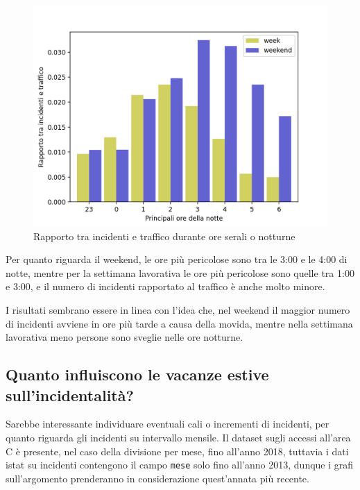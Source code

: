 \documentclass[a4paper]{report}
\newcommand{\columnstyle}[1]{\texttt{#1}}
\begin{document}
\begin{figure}
    \includegraphics[width=\linewidth]{../src/area_c/rapporto_inc_notte.png}
    \caption{Rapporto tra incidenti e traffico durante ore serali o notturne}
    \label{fig:rapp-inc-traff}
\end{figure}

Per quanto riguarda il weekend, le ore più pericolose sono tra le 3:00 e le 4:00 di notte, mentre per 
la settimana lavorativa le ore più pericolose sono quelle tra 1:00 e 3:00, e il numero di 
incidenti rapportato al traffico è anche molto minore. 

I risultati sembrano essere in linea con l'idea che, nel weekend il maggior 
numero di incidenti avviene in ore più tarde a causa della movida, mentre nella settimana lavorativa 
meno persone sono sveglie nelle ore notturne.

\subsection{Quanto influiscono le vacanze estive sull'incidentalità?}

Sarebbe interessante individuare eventuali cali o incrementi di incidenti, per quanto riguarda gli 
incidenti su intervallo mensile.
Il dataset sugli accessi all'area C è presente, nel caso della divisione per mese, fino all'anno 2018, 
tuttavia i dati istat su incidenti contengono il campo \columnstyle{mese} solo fino all'anno 2013,
dunque i grafi sull'argomento prenderanno in considerazione quest'annata più recente.
\end{document}
